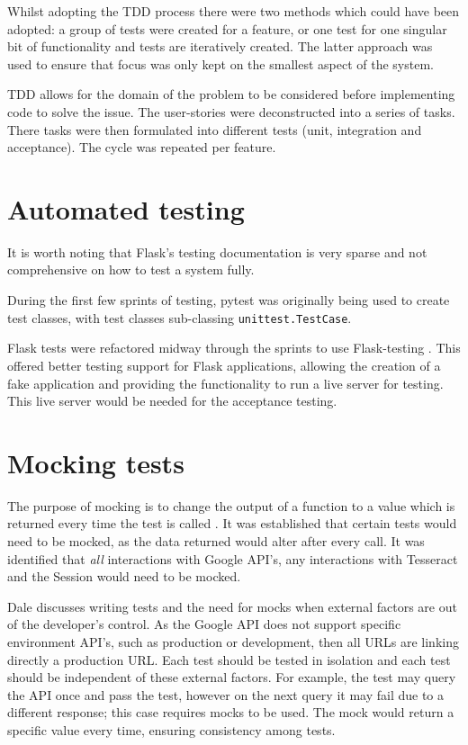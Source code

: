 Whilst adopting the TDD process there were two methods which could have been adopted:  a group of tests were created for a feature, or one test for one singular bit of functionality and tests are iteratively created. The latter approach was used to ensure that focus was only kept on the smallest aspect of the system.


TDD allows for the domain of the problem to be considered before implementing code to solve the issue. The user-stories were deconstructed into a series of tasks. There tasks were then formulated into different tests (unit, integration and acceptance). The cycle was repeated per feature.

\section{Automated testing}
It is worth noting that Flask's testing documentation is very sparse and not comprehensive on how to test a system fully.

During the first few sprints of testing, pytest \cite{citeulike:14020583} was originally being used to create test classes, with test classes sub-classing  \texttt{unittest.TestCase}.

Flask tests were refactored midway through the sprints to use Flask-testing \cite{citeulike:14020588}. This offered better testing support for Flask applications, allowing the creation of a fake application and providing the functionality to run a live server for testing. This live server would be needed for the acceptance testing.

\section{Mocking tests}
The purpose of mocking is to change the output of a function to a value which is returned every time the test is called \cite{citeulike:14020596}. It was established that certain tests would need to be mocked, as the data returned would alter after every call. It was identified that \textit{all} interactions with Google API's, any interactions with Tesseract and the Session would need to be mocked.

Dale \cite{citeulike:14020597} discusses writing tests and the need for mocks when external factors are out of the developer's control. As the Google API does not support specific environment API's, such as production or development, then all URLs are linking directly a production URL. Each test should be tested in isolation and each test should be independent of these external factors. For example, the test may query the API once and pass the test, however on the next query it may fail due to a different response; this case requires mocks to be used. The mock would return a specific value every time, ensuring consistency among tests.

